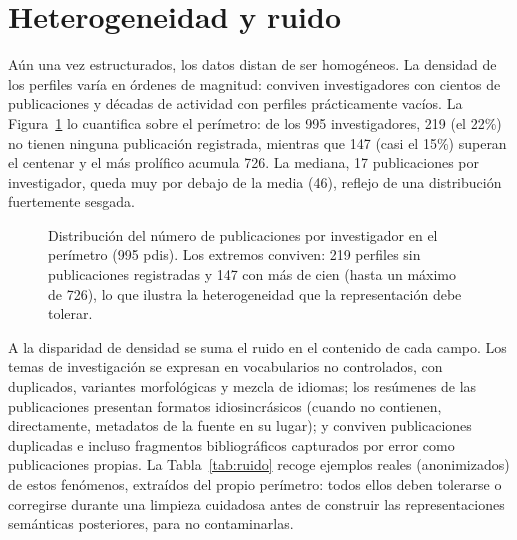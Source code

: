 \section{Heterogeneidad y ruido}
\label{sec:problema-heterogeneidad}

Aún una vez estructurados, los datos distan de ser homogéneos.
La densidad de los perfiles varía en órdenes de magnitud: conviven investigadores con cientos de publicaciones y décadas de actividad con perfiles prácticamente vacíos.
La Figura~\ref{fig:densidad} lo cuantifica sobre el perímetro: de los 995 investigadores, 219 (el 22\%) no tienen ninguna publicación registrada, mientras que 147 (casi el 15\%) superan el centenar y el más prolífico acumula 726.
La mediana, 17 publicaciones por investigador, queda muy por debajo de la media (46), reflejo de una distribución fuertemente sesgada.

\begin{figure}[htbp]
  \centering
  \caption[Distribución del número de publicaciones por PDI en el perímetro]{Distribución del número de publicaciones por investigador en el perímetro (995 \glspl{pdi}). Los extremos conviven: 219 perfiles sin publicaciones registradas y 147 con más de cien (hasta un máximo de 726), lo que ilustra la heterogeneidad que la representación debe tolerar.}
  \label{fig:densidad}
\end{figure}

A la disparidad de densidad se suma el ruido en el contenido de cada campo.
Los temas de investigación se expresan en vocabularios no controlados, con duplicados, variantes morfológicas y mezcla de idiomas; los resúmenes de las publicaciones presentan formatos idiosincrásicos (cuando no contienen, directamente, metadatos de la fuente en su lugar); y conviven publicaciones duplicadas e incluso fragmentos bibliográficos capturados por error como publicaciones propias.
La Tabla~\ref{tab:ruido} recoge ejemplos reales (anonimizados) de estos fenómenos, extraídos del propio perímetro: todos ellos deben tolerarse o corregirse durante una limpieza cuidadosa antes de construir las representaciones semánticas posteriores, para no contaminarlas.

